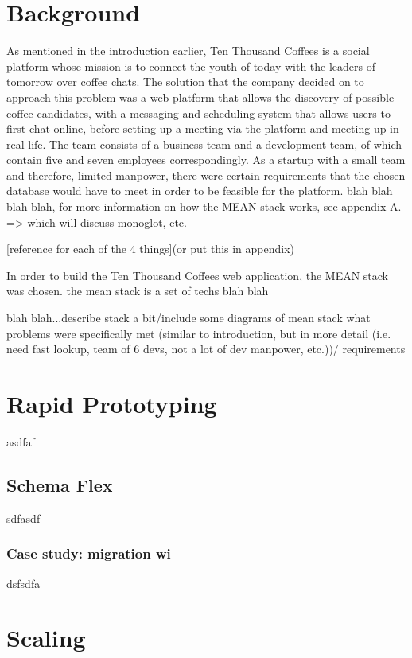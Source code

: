 \documentclass[12pt]{article}
\begin{document}
\section{Background}
As mentioned in the introduction earlier, Ten Thousand Coffees is a social platform whose mission is to connect the youth of today with the leaders of tomorrow over coffee chats. The solution that the company decided on to approach this problem was a web platform that allows the discovery of possible coffee candidates, with a messaging and scheduling system that allows users to first chat online, before setting up a meeting via the platform and meeting up in real life. The team consists of a business team and a development team, of which contain five and seven employees correspondingly. As a startup with a small team and therefore, limited manpower, there were certain requirements that the chosen database would have to meet in order to be feasible for the platform. blah blah blah blah, for more information on how the MEAN stack works, see appendix A. => which will discuss monoglot, etc.

[reference for each of the 4 things](or put this in appendix)

 In order to build the Ten Thousand Coffees web application, the MEAN stack was chosen. the mean stack is a set of techs blah blah

blah blah...describe stack a bit/include some diagrams of mean stack
what problems were specifically met (similar to introduction, but in more detail (i.e. need fast lookup, team of 6 devs, not a lot of dev manpower, etc.))/ requirements

\section{Rapid Prototyping}
asdfaf
\subsection{Schema Flex}
sdfasdf

\subsubsection{Case study: migration wi}
dsfsdfa

\section{Scaling}
\end{document}
